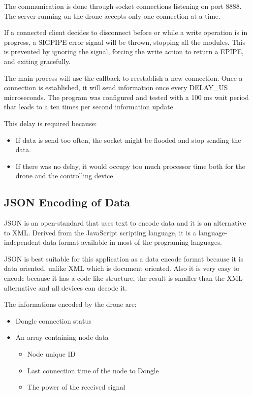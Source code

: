 The communication is done through socket connections listening on port 8888. The server running on the drone accepts only one connection at a time.

If a connected client decides to disconnect before or while a write operation is in progress, a SIGPIPE error signal will be thrown, stopping all the modules. This is prevented by ignoring the signal, forcing the write action to return a EPIPE, and exiting gracefully.

The main process will use the callback  to reestablish a new connection. Once a connection is established, it will send information once every DELAY\_US microseconds. The program was configured and tested with a 100 ms wait period that leads to a ten times per second information update.

This delay is required because:
\begin{itemize}

\item If data is send too often, the socket might be flooded and stop sending the data. %
\item If there was no delay, it would occupy too much processor time both for the drone and the controlling device.

\end{itemize}

\subsection{JSON Encoding of Data} \cite{json}
 
JSON is an open-standard that uses text to encode data and it is an alternative to XML. Derived from the JavaScript scripting language, it is a language-independent data format available in most of the programing languages.

JSON is best suitable for this application as a data encode format because it is data oriented, unlike XML which is document oriented. Also it is very easy to encode because it has a code like structure, the result is smaller than the XML alternative and all devices can decode it. 

The informations encoded by the drone are:
\begin{itemize}

\item Dongle connection status
\item An array containing node data
\begin{itemize}

	\item Node unique ID
	\item Last connection time of the node to Dongle
	\item The power of the received signal

	\end{itemize}
\end{itemize}
 

